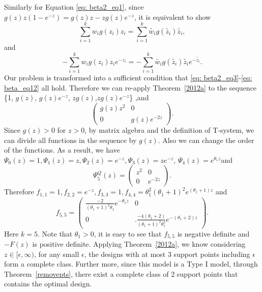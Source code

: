 \documentclass[11pt]{amsart}
\theoremstyle{definition}
\theoremstyle{remark}
\numberwithin{equation}{section}
\begin{document}
Similarly for Equation \eqref{eq: beta2_eq1}, since $g(z)z(1-e^{-z}) = g(z)z-zg(z)e^{-z}$, it is equivalent to show 
\begin{equation}\label{eq: beta_eq11}
\sum_{i=1}^{k} w_i g(z_i)z_i = \sum_{i=1}^{k} \tilde{w_i}  g(\tilde{z_i})\tilde{z_i},\end{equation} 
and  
\begin{equation}\label{eq: beta_eq12}
-\sum_{i=1}^{k} w_i  g(z_i)z_ie^{-z_i} = -\sum_{i=1}^{k} \tilde{w_i} g(\tilde{z_i}) \tilde{z_i}e^{-\tilde{z_i}}.\end{equation} 
Our problem is transformed into a sufficient condition that \eqref{eq: beta2_eq3}-\eqref{eq: beta_eq12} all hold. Therefore we can re-apply Theorem~\ref{2012a} to the sequence \{1, $g(z)$, $g(z)e^{-z}$, $zg(z)$,$zg(z)e^{-z}$\} ,and \[\left( \begin{array}{cc}
g(z)z^2& 0\\
0 &g(z)e^{-2z}
\end{array} \right).\] Since $g(z)>0$ for $z>0$, by matrix algebra and the definition of T-system, we can divide all functions in the sequence by $g(z)$. Also we can change the order of the functions. As a result, we have $\Psi_0(z) =1, \Psi_1(z) = z, \Psi_2(z) = e^{-z}, \Psi_3(z) =ze^{-z}$, $\Psi_4(z) =e^{\theta_1z}$and  \[\Psi_5^Q(z)= \left( \begin{array}{cc}
z^2& 0\\
0 &e^{-2z}
\end{array} \right).\]  Therefore $f_{1,1} = 1,f_{2,2} = e^{-z},f_{3,3} = 1,f_{4,4} = \theta_1^2(\theta_1+1)^2e^{(\theta_1+1)z}$ and  \[f_{5,5}= \left( \begin{array}{cc}
\frac{-2}{(\theta_1+1)^2\theta_1}e^{-\theta_1z}& 0\\
0 &. \frac{-4(\theta_1+2)}{(\theta_1+1)^2\theta_1^2}e^{-(\theta_1+2)z}
\end{array} \right).\]  Here $k=5$. Note that $\theta_1>0$, it is easy to see that $f_{5,5}$ is negative definite and $-F(z)$ is positive definite. Applying Theorem~\ref{2012a}, we know considering $z\in[\epsilon,\infty)$, for any small $\epsilon$, the designs with at most 3 support points including $\epsilon$ form a complete class. Further more, since this model is a Type I model, through Theorem~\ref{removepts}, there exist a complete class of 2 support points that contains the optimal design. 
\end{document}
